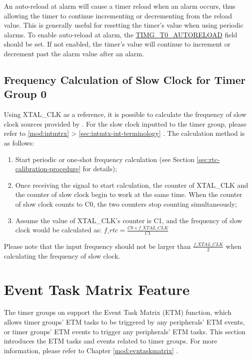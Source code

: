 \documentclass[main\_\_EN.tex]{subfiles}
\begin{document}
An auto-reload at alarm will cause a timer reload when an alarm occurs, thus allowing the timer to continue incrementing or decrementing from the reload value. This is generally useful for resetting the timer's value when using periodic alarms. To enable auto-reload at alarm, the \hyperref[fielddesc:TIMGTXAUTORELOAD]{TIMG\_T0\_AUTORELOAD} field should be set. If not enabled, the timer's value will continue to increment or decrement past the alarm value after an alarm.

\subsection{Frequency Calculation of Slow Clock for Timer Group 0}
\label{sec:rtc-calibration-desc}

Using XTAL\_CLK as a reference, it is possible to calculate the frequency of slow clock sources provided by \chipname{}. For the slow clock inputted to the timer group, please refer to \ref{mod:intmtrx} \textit{} > \ref{sec:intmtx-int-terminology} \textit{}. The calculation method is as follows:

\begin{enumerate}
    \item Start periodic or one-shot frequency calculation (see Section \ref{sec:rtc-calibration-procedure} for details);
    \item Once receiving the signal to start calculation, the counter of XTAL\_CLK and the counter of slow clock begin to work at the same time. When the counter of slow clock counts to C0, the two counters stop counting simultaneously;
    \item Assume the value of XTAL\_CLK's counter is C1, and the frequency of slow clock would be calculated as: $f\_rtc = \frac{C0 \times f\_XTAL\_CLK}{C1}$
\end{enumerate}

Please note that the input frequency should not be larger than $\frac{f\_XTAL\_CLK}{2}$ when calculating the frequency of slow clock.


\section{Event Task Matrix Feature}
\label{sec:timg-etm-func}

The timer groups on \chipname{} support the Event Task Matrix (ETM) function, which allows timer groups' ETM tasks to be triggered by any peripherals' ETM events, or timer groups' ETM events to trigger any peripherals' ETM tasks. This section introduces the ETM tasks and events related to timer groups. For more information, please refer to Chapter \ref{mod:evntaskmatrix} .
\end{document}
